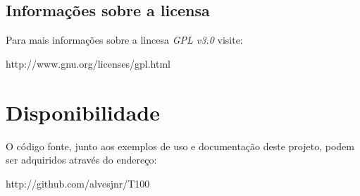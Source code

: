 \subsection{Informações sobre a licensa}

Para mais informações sobre a lincesa \textit{GPL v3.0} visite:

http://www.gnu.org/licenses/gpl.html

\section{Disponibilidade}

O código fonte, junto aos exemplos de uso e documentação deste projeto, podem ser adquiridos através do endereço:

http://github.com/alvesjnr/T100
